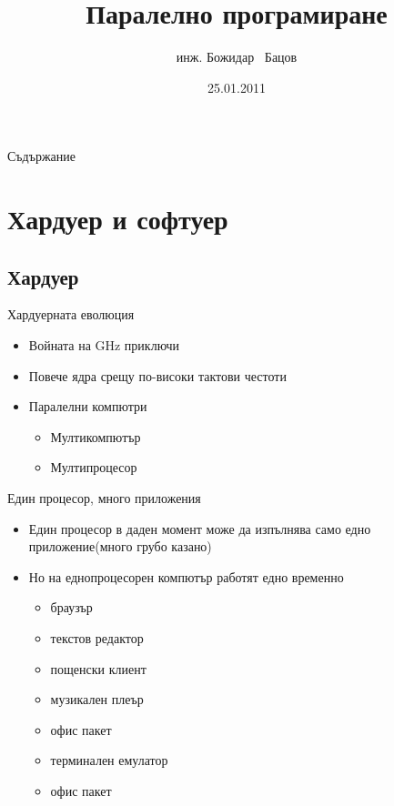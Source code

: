 \documentclass{beamer}
\title{Паралелно програмиране}
\author{инж. Божидар ~Бацов}
\institute{Drow Ltd.}
\date{25.01.2011}
\begin{document}
\begin{frame}
  \titlepage
\end{frame}

\begin{frame}{Съдържание}
  \tableofcontents[pausesections]
\end{frame}

\section{Хардуер и софтуер}

\subsection{Хардуер}

\begin{frame}{Хардуерната еволюция}
  \begin{itemize}
  \item Войната на GHz приключи
  \item Повече ядра срещу по-високи тактови честоти
  \item Паралелни компютри
    \begin{itemize}
      \item Мултикомпютър
      \item Мултипроцесор
    \end{itemize}
  \end{itemize}
\end{frame}

\begin{frame}{Един процесор, много приложения}
  \transdissolve
  \begin{itemize}
  \item Един процесор в даден момент може да изпълнява само едно
    приложение(много грубо казано)
  \item Но на еднопроцесорен компютър работят едно временно
    \begin{itemize}
      \item браузър
      \item текстов редактор
      \item пощенски клиент
      \item музикален плеър 
      \item офис пакет
      \item терминален емулатор
      \item офис пакет
    \end{itemize}

  \end{itemize}
\end{frame}
\end{document}
